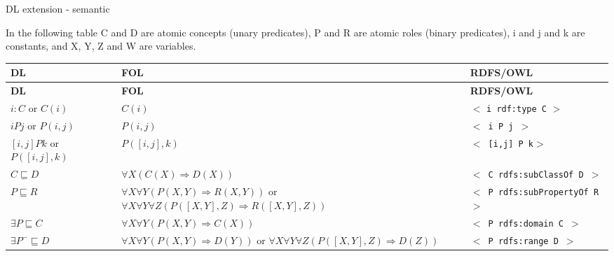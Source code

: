 \documentclass[]{article}
\begin{document}
\begin{center}
\LARGE
DL extension - semantic
\end{center}

In the following table C and D are atomic concepts (unary predicates), P and R are atomic roles (binary predicates),  i and j and k are constants, and X, Y, Z and W are variables.

\centering
\begin{longtable}{| p{3.7cm} | p{7cm} | p{5.2cm} |}
	\hline
	\centering \textbf{DL} & \centering \textbf{FOL} & \centering \textbf{RDFS/OWL}
	\\
	\endfirsthead
	\hline	
	\centering \textbf{DL} & \centering \textbf{FOL} & \centering \textbf{RDFS/OWL}
	\\
	\endhead
	
	\hline
		$i:C$ or $C(i)$
		&
		$C(i)$
		&
		$<$ \texttt{i rdf:type C} $>$
	\\
		
	\hline
		$i P j$ or $P(i,j)$
		&
		$P(i,j)$
		&
		$<$\texttt{ i P j }$>$
	\\
	
	\hline
		\cellcolor[gray]{0.9} $[i,j] P k$ or $P([i,j],k)$
		&
		\cellcolor[gray]{0.9} $P([i,j],k)$
		&
		\cellcolor[gray]{0.9} $<$\texttt{ [i,j] P k}$>$
	\\
	
	\hline
		$C \sqsubseteq D$	
		&
		$\forall X(C(X) \Rightarrow D(X))$
		&
		$<$\texttt{ C rdfs:subClassOf D }$>$
	\\

	\hline
		\cellcolor[gray]{0.9} $P \sqsubseteq R$	
		&
		\cellcolor[gray]{0.9} $\forall X \forall Y (P(X,Y) \Rightarrow R(X,Y))$ or \newline
		$\forall X \forall Y \forall Z (P([X,Y],Z) \Rightarrow R([X,Y],Z))$
		&
		\cellcolor[gray]{0.9} $<$\texttt{ P rdfs:subPropertyOf R}$>$
	\\

	\hline
		$\exists P \sqsubseteq C$	
		&
		$\forall X \forall Y (P(X,Y) \Rightarrow C(X))$
		&
		$<$\texttt{ P rdfs:domain C }$>$
	\\

	\hline
		\cellcolor[gray]{0.9} $\exists P^{-} \sqsubseteq D$	
		&
		\cellcolor[gray]{0.9} $\forall X \forall Y (P(X,Y) \Rightarrow D(Y))$ or \newline
		$\forall X \forall Y \forall Z (P([X,Y],Z) \Rightarrow D(Z))$
		&
		\cellcolor[gray]{0.9} $<$\texttt{ P rdfs:range D }$>$
	\\
	

\end{longtable}
\end{document}
